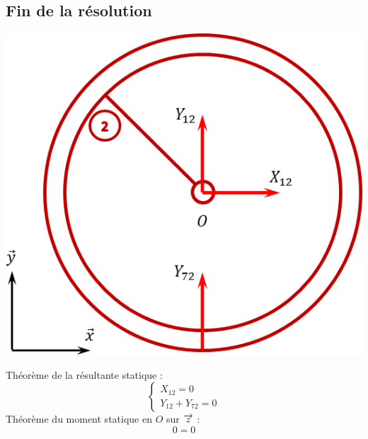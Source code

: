 \documentclass[10pt]{article}
\begin{document}
\subsection*{Fin de la résolution}


\begin{exemple}
\begin{minipage}[c]{.3\linewidth}
\begin{center}
\includegraphics[width=.9\textwidth]{images/2}
\end{center}
\end{minipage}\hfill
\begin{minipage}[c]{.65\linewidth}
Théorème de la résultante statique : 
$$
\left\{
\begin{array}{l}
X_{12}=0 \\
Y_{12}+Y_{72}=0 
\end{array}
\right.
$$
Théorème du moment statique en $O$ sur $\overrightarrow{z}$ : 
$$
0=0
$$
\end{minipage}


\end{exemple}
\end{document}
